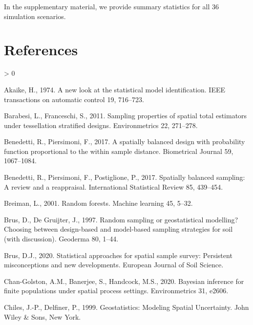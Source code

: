 \documentclass[]{elsarticle} %
\newlength{\cslhangindent}
\newenvironment{CSLReferences}[2] %
 {%
  \setlength{\parindent}{0pt}
  \ifodd #1 \everypar{\setlength{\hangindent}{\cslhangindent}}\ignorespaces\fi
  \ifnum #2 > 0
  \setlength{\parskip}{#2\baselineskip}
  \fi
 }%
 {}
\begin{document}
In the supplementary material, we provide summary statistics for all 36
simulation scenarios.

\hypertarget{references}{%
\section*{References}\label{references}}

\hypertarget{refs}{}
\begin{CSLReferences}{1}{0}
\leavevmode\hypertarget{ref-akaike1974new}{}%
Akaike, H., 1974. A new look at the statistical model identification.
IEEE transactions on automatic control 19, 716--723.

\leavevmode\hypertarget{ref-barabesi2011sampling}{}%
Barabesi, L., Franceschi, S., 2011. Sampling properties of spatial total
estimators under tessellation stratified designs. Environmetrics 22,
271--278.

\leavevmode\hypertarget{ref-benedetti2017spatially}{}%
Benedetti, R., Piersimoni, F., 2017. A spatially balanced design with
probability function proportional to the within sample distance.
Biometrical Journal 59, 1067--1084.

\leavevmode\hypertarget{ref-benedetti2017spatiallyreview}{}%
Benedetti, R., Piersimoni, F., Postiglione, P., 2017. Spatially balanced
sampling: A review and a reappraisal. International Statistical Review
85, 439--454.

\leavevmode\hypertarget{ref-breiman2001random}{}%
Breiman, L., 2001. Random forests. Machine learning 45, 5--32.

\leavevmode\hypertarget{ref-brus1997random}{}%
Brus, D., De Gruijter, J., 1997. Random sampling or geostatistical
modelling? Choosing between design-based and model-based sampling
strategies for soil (with discussion). Geoderma 80, 1--44.

\leavevmode\hypertarget{ref-brus2020statistical}{}%
Brus, D.J., 2020. Statistical approaches for spatial sample survey:
Persistent misconceptions and new developments. European Journal of Soil
Science.

\leavevmode\hypertarget{ref-chan2020bayesian}{}%
Chan-Golston, A.M., Banerjee, S., Handcock, M.S., 2020. Bayesian
inference for finite populations under spatial process settings.
Environmetrics 31, e2606.

\leavevmode\hypertarget{ref-chiles1999geostatistics}{}%
Chiles, J.-P., Delfiner, P., 1999. Geostatistics: {Modeling Spatial
Uncertainty}. {John Wiley \& Sons}, New York.


\end{CSLReferences}
\end{document}
